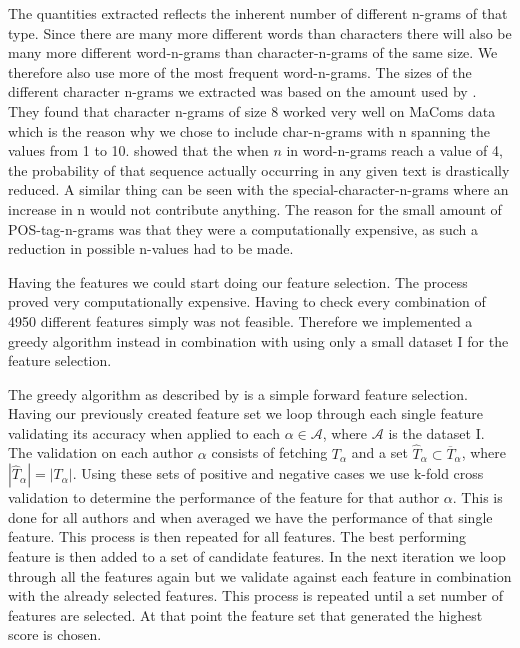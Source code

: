 The quantities extracted reflects the inherent number of different n-grams of
that type. Since there are many more different words than characters there will
also be many more different word-n-grams than character-n-grams of the same
size. We therefore also use more of the most frequent word-n-grams. The sizes
of the different character n-grams we extracted was based on the amount used by
\citet{aalykke2016}. They found that character n-grams of size 8 worked very
well on MaComs data which is the reason why we chose to include char-n-grams
with n spanning the values from 1 to 10. \citet{US} showed that the when $n$
in word-n-grams reach a value of 4, the probability of that sequence actually
occurring in any given text is drastically reduced. A similar thing can be seen
with the special-character-n-grams where an increase in n would not contribute
anything. The reason for the small amount of \gls{POS}-tag-n-grams was that they
were a computationally expensive, as such a reduction in possible n-values had
to be made.

Having the features we could start doing our feature selection. The process
proved very computationally expensive. Having to check every combination of 4950
different features simply was not feasible. Therefore we implemented a greedy
algorithm instead in combination with using only a small dataset \gls{I} for the
feature selection.

The greedy algorithm as described by \citet{kanDeng} is a simple forward feature
selection. Having our previously created feature set we loop through each single
feature validating its accuracy when applied to each $\alpha \in \mathcal{A}$,
where $\mathcal{A}$ is the dataset \gls{I}. The validation on each author
$\alpha$ consists of fetching $T_{\alpha}$ and a set $\hat{T}_{\alpha} \subset
\overline{T}_\alpha$, where $|\hat{T}_\alpha| = |T_\alpha|$. Using these sets
of positive and negative cases we use k-fold cross validation to determine
the performance of the feature for that author $\alpha$. This is done for all
authors and when averaged we have the performance of that single feature. This
process is then repeated for all features. The best performing feature is then
added to a set of candidate features. In the next iteration we loop through all
the features again but we validate against each feature in combination with
the already selected features. This process is repeated until a set number of
features are selected. At that point the feature set that generated the highest
score is chosen.

